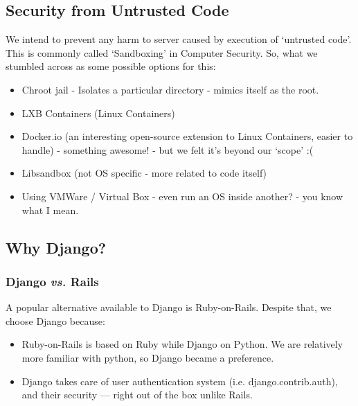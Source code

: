 \documentclass[hidelinks, a4paper,12pt, titlepage]{article}
\begin{document}
\subsection{Security from Untrusted Code}
We intend to prevent any harm to server caused by execution of ‘untrusted code’. This is commonly called ‘Sandboxing’ in Computer Security. So, what we stumbled across as some possible options for this:\hfill\cite{sandbox}\cite{sandbox1}
\begin{itemize}
\item Chroot jail - Isolates a particular directory - mimics itself as the root.
\item LXB Containers (Linux Containers)
\item Docker.io (an interesting open-source extension to Linux Containers, easier to handle) - something awesome! - but we felt it’s beyond our ‘scope’ :(
\item Libsandbox (not OS specific - more related to code itself)
\item Using VMWare / Virtual Box - even run an OS inside another? - you know what I mean.
\end{itemize}
\subsection{Why Django?}
\subsubsection{Django \emph{vs.} Rails}
A popular alternative available to Django is Ruby-on-Rails. Despite that, we choose Django because:
\begin{itemize}
\item Ruby-on-Rails is based on Ruby while Django on Python. We are relatively more familiar with python, so Django became a preference.
\item Django takes care of user authentication system (i.e. django.contrib.auth), and their security — right out of the box unlike Rails.
\end{itemize}
\end{document}
